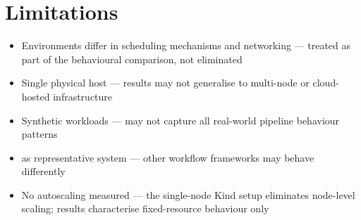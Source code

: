 \section{Limitations}

\begin{itemize}
  \item Environments differ in scheduling mechanisms and networking --- treated as part of
        the behavioural comparison, not eliminated
  \item Single physical host --- results may not generalise to multi-node or cloud-hosted
        infrastructure
  \item Synthetic workloads --- may not capture all real-world pipeline behaviour patterns
  \item \dagster{} as representative system --- other workflow frameworks may behave
        differently
  \item No autoscaling measured --- the single-node Kind setup eliminates node-level
        scaling; results characterise fixed-resource behaviour only
\end{itemize}
